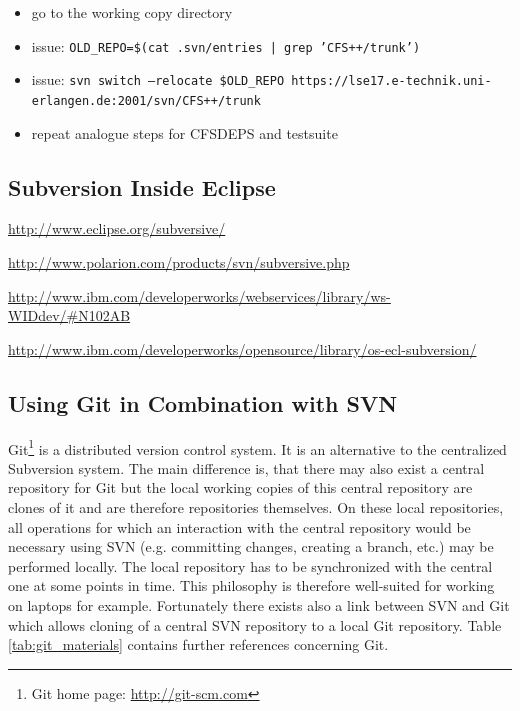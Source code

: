 \begin{itemize}
\item go to the working copy directory
\item issue: {\tt OLD\_REPO=\$(cat .svn/entries | grep 'CFS++/trunk')}
\item issue: {\tt svn switch --relocate \$OLD\_REPO https://lse17.e-technik.uni-erlangen.de:2001/svn/CFS++/trunk}
\item repeat analogue steps for CFSDEPS and testsuite
\end{itemize}

\subsection{Subversion  Inside  Eclipse}  

\noindent \url{http://www.eclipse.org/subversive/}

\noindent \url{http://www.polarion.com/products/svn/subversive.php}

\noindent \url{http://www.ibm.com/developerworks/webservices/library/ws-WIDdev/#N102AB}

\noindent \url{http://www.ibm.com/developerworks/opensource/library/os-ecl-subversion/}

\subsection{Using Git in Combination with SVN}
\label{sec:git}

Git\footnote{Git home page: \url{http://git-scm.com}} is a distributed version
control  system.    It  is  an  alternative  to   the  centralized  Subversion
system. The main difference is, that there may also exist a central repository
for Git but the local working  copies of this central repository are clones of
it and are therefore repositories themselves. On these local repositories, all
operations  for which  an interaction  with  the central  repository would  be
necessary using SVN (e.g. committing changes, creating a branch, etc.)  may be
performed  locally. The  local  repository  has to  be  synchronized with  the
central one at some points  in time.  This philosophy is therefore well-suited
for  working on  laptops for  example. Fortunately  there exists  also  a link
between SVN  and Git  which allows cloning  of a  central SVN repository  to a
local   Git  repository.   Table   \ref{tab:git_materials}  contains   further
references concerning Git.

